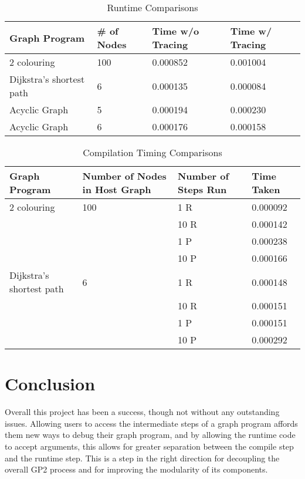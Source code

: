 \documentclass{UoYCSproject}
\begin{document}
\begin{table}
\centering
\begin{tabular}{p{4cm} | l | l | l}
	Graph Program & \# of Nodes & Time w/o Tracing & Time w/ Tracing \\ 
	\hline
	2 colouring              & 100 & 0.000852 & 0.001004 \\
	Dijkstra's shortest path & 6   & 0.000135 & 0.000084 \\
	Acyclic Graph            & 5   & 0.000194 & 0.000230 \\
	Acyclic Graph            & 6   & 0.000176 & 0.000158 \\
\end{tabular}
\caption{Runtime Comparisons}
\label{table:whole_execution_timings}
\end{table}

\begin{table}
\centering
\begin{tabular}{l | l | l | l}
	Graph Program & Number of Nodes in Host Graph & Number of Steps Run & Time Taken \\
	\hline
	2 colouring              & 100 & 1  R & 0.000092 \\
	                         &     & 10 R & 0.000142 \\
	                         &     & 1  P & 0.000238 \\
	                         &     & 10 P & 0.000166 \\
	\hline
	Dijkstra's shortest path & 6   & 1  R & 0.000148 \\
	                         &     & 10 R & 0.000151 \\
	                         &     & 1  P & 0.000151 \\
	                         &     & 10 P & 0.000292 \\
\end{tabular}
\caption{Compilation Timing Comparisons}
\label{table:step_execution_timings}
\end{table}

\chapter{Conclusion}

Overall this project has been a success, though not without any outstanding issues. Allowing users to access the intermediate steps of a graph program affords them new ways to debug their graph program, and by allowing the runtime code to accept arguments, this allows for greater separation between the compile step and the runtime step. This is a step in the right direction for decoupling the overall GP2 process and for improving the modularity of its components.
\end{document}
